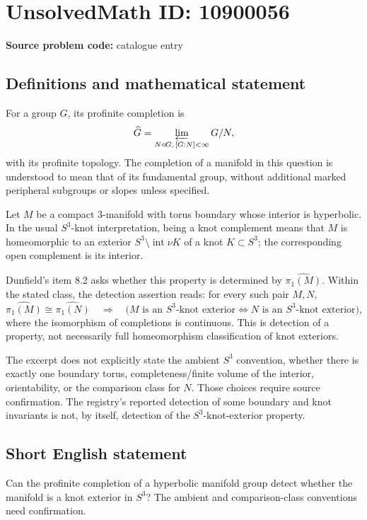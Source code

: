 \documentclass[11pt]{article}
\begin{document}
\section*{UnsolvedMath ID: 10900056}
\textbf{Source problem code:} catalogue entry
\subsection{Definitions and mathematical statement}
For a group $G$, its profinite completion is
\[
 \widehat G=\varprojlim_{N\triangleleft G,\,[G:N]<\infty}G/N,
\]
with its profinite topology. The completion of a manifold in this question is understood to mean that of its fundamental group, without additional marked peripheral subgroups or slopes unless specified.

Let $M$ be a compact $3$-manifold with torus boundary whose interior is hyperbolic. In the usual $S^3$-knot interpretation, being a knot complement means that $M$ is homeomorphic to an exterior $S^3\setminus\operatorname{int}\nu K$ of a knot $K\subset S^3$; the corresponding open complement is its interior.

Dunfield's item 8.2 asks whether this property is determined by $\widehat{\pi_1(M)}$. Within the stated class, the detection assertion reads: for every such pair $M,N$,
\[
 \widehat{\pi_1(M)}\cong\widehat{\pi_1(N)}
 \quad\Longrightarrow\quad
 \bigl(M\text{ is an }S^3\text{-knot exterior}\iff
 N\text{ is an }S^3\text{-knot exterior}\bigr),
\]
where the isomorphism of completions is continuous. This is detection of a property, not necessarily full homeomorphism classification of knot exteriors.

The excerpt does not explicitly state the ambient $S^3$ convention, whether there is exactly one boundary torus, completeness/finite volume of the interior, orientability, or the comparison class for $N$. Those choices require source confirmation. The registry's reported detection of some boundary and knot invariants is not, by itself, detection of the $S^3$-knot-exterior property.
\subsection{Short English statement}
Can the profinite completion of a hyperbolic manifold group detect whether the manifold is a knot exterior in $S^3$? The ambient and comparison-class conventions need confirmation.
\end{document}

